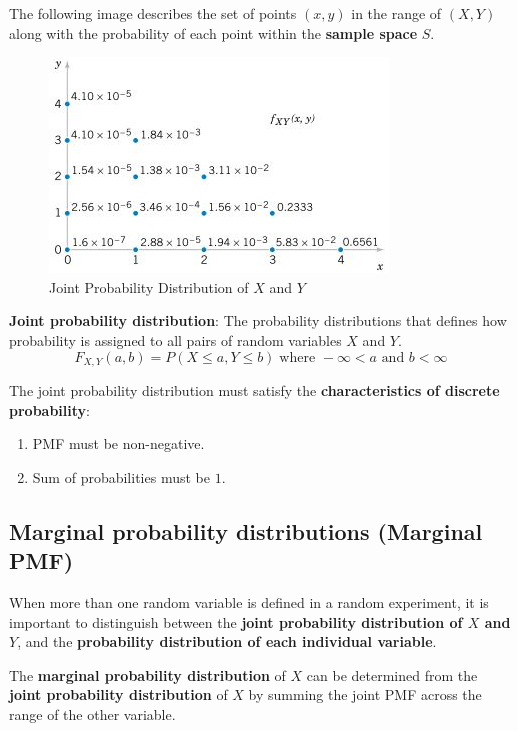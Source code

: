 \documentclass[10pt,a4paper]{article}
\begin{document}
The following image describes the set of points $(x,y)$ in the range of $(X,Y)$ along with the
probability of each point within the \textbf{sample space} $S$.

\begin{figure} [h!]
    \centering
    \includegraphics[]{Joint_case.JPG}
    \caption{Joint Probability Distribution of $X$ and $Y$}
    \label{fig:Case_joint}
\end{figure}

\begin{tcolorbox}[colback=white]
    \textbf{Joint probability distribution}: The probability distributions that defines how
    probability is assigned to all pairs of random variables $X$ and $Y$.
    $$
    F_{X,Y}(a,b) = P(X \leq a, Y \leq b) \; \text{where } -\infty < a \text{ and } b<\infty
    $$
\end{tcolorbox}

The joint probability distribution must satisfy the \textbf{characteristics of discrete
probability}:
\begin{enumerate}
    \item PMF must be non-negative.
    \item Sum of probabilities must be $1$.
\end{enumerate}

\subsection{Marginal probability distributions (Marginal PMF)}

When more than one random variable is defined in a random experiment, it is important to
distinguish between the \textbf{joint probability distribution of $X$ and $Y$}, and the
\textbf{probability distribution of each individual variable}.

The \textbf{marginal probability distribution} of $X$ can be determined from the \textbf{joint
probability distribution} of $X$ by summing the joint PMF across the range of the other variable.
\end{document}
